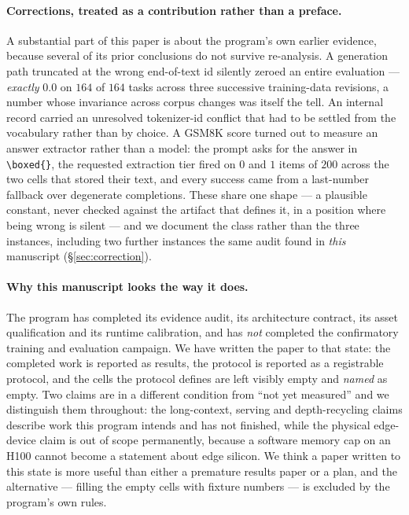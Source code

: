 \documentclass[11pt]{article}
\begin{document}
\paragraph{Corrections, treated as a contribution rather than a preface.} A substantial part
of this paper is about the program's own earlier evidence, because several of its prior
conclusions do not survive re-analysis. A generation path truncated at the wrong
end-of-text id silently zeroed an entire evaluation --- \emph{exactly} $0.0$ on $164$ of
$164$ tasks across three successive training-data revisions, a number whose invariance
across corpus changes was itself the tell. An internal record carried an unresolved
tokenizer-id conflict that had to be settled from the vocabulary rather than by choice. A
GSM8K score turned out to measure an answer extractor rather than a model: the prompt asks
for the answer in \texttt{\textbackslash boxed\{\}}, the requested extraction tier fired on
$0$ and $1$ items of $200$ across the two cells that stored their text, and every success
came from a last-number fallback over degenerate completions. These share one shape --- a
plausible constant, never checked against the artifact that defines it, in a position where
being wrong is silent --- and we document the class rather than the three instances,
including two further instances the same audit found in \emph{this} manuscript
(\S\ref{sec:correction}).

\paragraph{Why this manuscript looks the way it does.} The program has completed its
evidence audit, its architecture contract, its asset qualification and its runtime
calibration, and has \emph{not} completed the confirmatory training and evaluation campaign.
We have written the paper to that state: the completed work is reported as results, the
protocol is reported as a registrable protocol, and the cells the protocol defines are left
visibly empty and \emph{named} as empty. Two claims are in a different condition from
``not yet measured'' and we distinguish them throughout: the long-context, serving and
depth-recycling claims describe work this program intends and has not finished, while the
physical edge-device claim is out of scope permanently, because a software memory cap on an
H100 cannot become a statement about edge silicon. We think a paper written to this state is
more useful than either a premature results paper or a plan, and the alternative --- filling
the empty cells with fixture numbers --- is excluded by the program's own rules.
\end{document}
